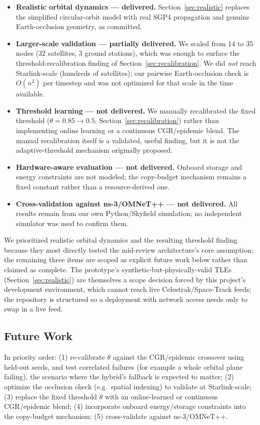 \documentclass[10pt,twocolumn]{article}
\begin{document}
\begin{itemize}[leftmargin=1.1em]
    \item \textbf{Realistic orbital dynamics --- delivered.} Section~\ref{sec:realistic} replaces the simplified circular-orbit model with real SGP4 propagation and genuine Earth-occlusion geometry, as committed.
    \item \textbf{Larger-scale validation --- partially delivered.} We scaled from 14 to 35 nodes (32 satellites, 3 ground stations), which was enough to surface the threshold-recalibration finding of Section~\ref{sec:recalibration}. We did \emph{not} reach Starlink-scale (hundreds of satellites); our pairwise Earth-occlusion check is $O(n^2)$ per timestep and was not optimized for that scale in the time available.
    \item \textbf{Threshold learning --- not delivered.} We manually recalibrated the fixed threshold ($\theta=0.85 \to 0.5$, Section~\ref{sec:recalibration}) rather than implementing online learning or a continuous CGR/epidemic blend. The manual recalibration itself is a validated, useful finding, but it is not the adaptive-threshold mechanism originally proposed.
    \item \textbf{Hardware-aware evaluation --- not delivered.} Onboard storage and energy constraints are not modeled; the copy-budget mechanism remains a fixed constant rather than a resource-derived one.
    \item \textbf{Cross-validation against ns-3/OMNeT++ --- not delivered.} All results remain from our own Python/Skyfield simulation; no independent simulator was used to confirm them.
\end{itemize}

We prioritized realistic orbital dynamics and the resulting threshold finding because they most directly tested the mid-review architecture's core assumption; the remaining three items are scoped as explicit future work below rather than claimed as complete. The prototype's synthetic-but-physically-valid TLEs (Section~\ref{sec:realistic}) are themselves a scope decision forced by this project's development environment, which cannot reach live Celestrak/Space-Track feeds; the repository is structured so a deployment with network access needs only to swap in a live feed.

\subsection{Future Work}
In priority order: (1) re-calibrate $\theta$ against the CGR/epidemic crossover using held-out seeds, and test correlated failures (for example a whole orbital plane failing), the scenario where the hybrid's fallback is expected to matter; (2) optimize the occlusion check (e.g.\ spatial indexing) to validate at Starlink-scale; (3) replace the fixed threshold $\theta$ with an online-learned or continuous CGR/epidemic blend; (4) incorporate onboard energy/storage constraints into the copy-budget mechanism; (5) cross-validate against ns-3/OMNeT++.
\end{document}
